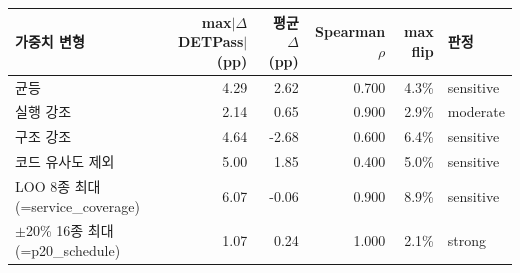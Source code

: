 \begin{tabular}{lrrrrl}
\hline
가중치 변형 & max$|\Delta$DETPass$|$(pp) & 평균 $\Delta$(pp) & Spearman $\rho$ & max flip & 판정 \\
\hline
균등 & 4.29 & 2.62 & 0.700 & 4.3\% & sensitive \\
실행 강조 & 2.14 & 0.65 & 0.900 & 2.9\% & moderate \\
구조 강조 & 4.64 & -2.68 & 0.600 & 6.4\% & sensitive \\
코드 유사도 제외 & 5.00 & 1.85 & 0.400 & 5.0\% & sensitive \\
\hline
LOO 8종 최대(=service\_coverage) & 6.07 & -0.06 & 0.900 & 8.9\% & sensitive \\
$\pm$20\% 16종 최대(=p20\_schedule) & 1.07 & 0.24 & 1.000 & 2.1\% & strong \\
\hline
\end{tabular}
